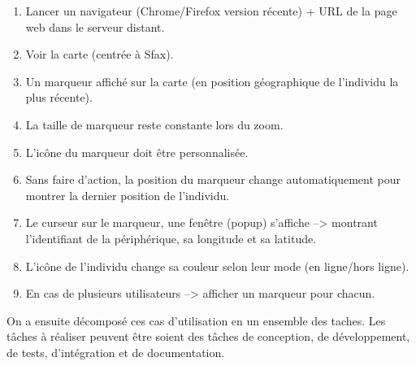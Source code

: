 \begin{enumerate}
    \item Lancer un navigateur (Chrome/Firefox version récente) + URL de la
        page web dans le serveur distant.
    \item Voir la carte (centrée à Sfax).
    \item Un marqueur affiché sur la carte (en position géographique de
        l'individu la plus récente).
    \item La taille de marqueur reste constante lors du zoom.
    \item L'icône du marqueur doit être personnalisée.
    \item Sans faire d'action, la position du marqueur change automatiquement
        pour montrer la dernier position de l'individu.
    \item Le curseur sur le marqueur, une fenêtre (popup) s'affiche -->
        montrant l'identifiant de la périphérique, sa longitude et sa latitude.
    \item L'icône de l'individu change sa couleur selon leur mode (en
        ligne/hors ligne).
    \item En cas de plusieurs utilisateurs --> afficher un marqueur pour
        chacun.
\end{enumerate}

On a ensuite décomposé ces cas d'utilisation en un ensemble des taches. Les
tâches à réaliser peuvent être soient des tâches de conception, de
développement, de tests, d'intégration et de documentation.

